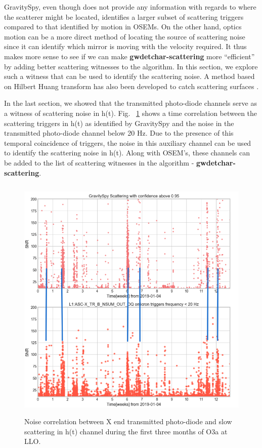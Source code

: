 \documentclass[12pt]{iopart}
\begin{document}
GravitySpy, even though does not provide any information with regards to where the scatterer might be located, identifies a larger subset of scattering triggers compared to that identified by motion in OSEMs. On the other hand, optics motion can be a more direct method of locating the source of scattering noise since it can identify which mirror is moving with the velocity required. It thus makes more sense to see if we can make \textbf{gwdetchar-scattering} more ``efficient'' by adding better scattering witnesses to the algorithm. In this section, we explore such a witness that can be used to identify the scattering noise. A method based on Hilbert Huang transform has also been developed to catch scattering surfaces \cite{hhtransform}.

In the last section, we showed that the transmitted photo-diode channels serve as a witness of scattering noise in h(t). Fig. ~\ref{fig:transetmx} shows a time correlation between the scattering triggers in h(t) as identified by GravitySpy and the noise in the transmitted photo-diode channel below 20 Hz. Due to the presence of this temporal coincidence of triggers, the noise in this auxiliary channel can be used to identify the scattering noise in h(t). Along with OSEM’s, these channels can be added to the list of scattering witnesses in the algorithm - \textbf{gwdetchar-scattering}.

\begin{figure}[h]
  \centering
         \includegraphics[width = 14cm,height=12cm]{htxtrb_corr2.png}
         \caption{Noise correlation between X end transmitted photo-diode and slow scattering in h(t) channel during the first three months of O3a at LLO. }
    \label{fig:transetmx}
\end{figure}
\end{document}
